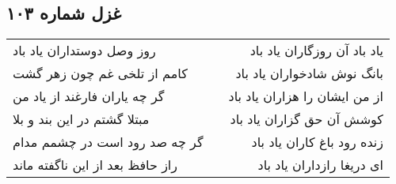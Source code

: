 \begin{center}
\section*{غزل شماره ۱۰۳}
\label{sec:sh103}
\begin{longtable}{l p{0.5cm} r}
روز وصل دوستداران یاد باد
&&
یاد باد آن روزگاران یاد باد
\\
کامم از تلخی غم چون زهر گشت
&&
بانگ نوش شادخواران یاد باد
\\
گر چه یاران فارغند از یاد من
&&
از من ایشان را هزاران یاد باد
\\
مبتلا گشتم در این بند و بلا
&&
کوشش آن حق گزاران یاد باد
\\
گر چه صد رود است در چشمم مدام
&&
زنده رود باغ کاران یاد باد
\\
راز حافظ بعد از این ناگفته ماند
&&
ای دریغا رازداران یاد باد
\\
\end{longtable}
\end{center}

